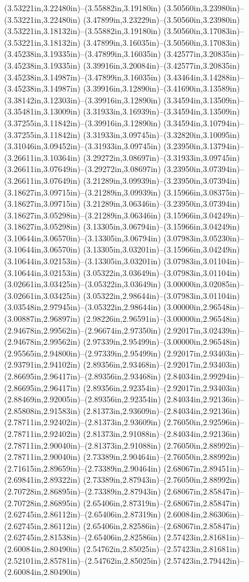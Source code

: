 (3.53221in,3.22480in)--(3.55882in,3.19180in) (3.50560in,3.23980in)--(3.53221in,3.22480in) (3.47899in,3.23229in)--(3.50560in,3.23980in) (3.53221in,3.18132in)--(3.55882in,3.19180in) (3.50560in,3.17083in)--(3.53221in,3.18132in) (3.47899in,3.16035in)--(3.50560in,3.17083in) (3.45238in,3.19335in)--(3.47899in,3.16035in) (3.42577in,3.20835in)--(3.45238in,3.19335in) (3.39916in,3.20084in)--(3.42577in,3.20835in) (3.45238in,3.14987in)--(3.47899in,3.16035in) (3.43464in,3.14288in)--(3.45238in,3.14987in) (3.39916in,3.12890in)--(3.41690in,3.13589in) (3.38142in,3.12303in)--(3.39916in,3.12890in) (3.34594in,3.13509in)--(3.35481in,3.13009in) (3.31933in,3.16939in)--(3.34594in,3.13509in) (3.37255in,3.11842in)--(3.39916in,3.12890in) (3.34594in,3.10794in)--(3.37255in,3.11842in) (3.31933in,3.09745in)--(3.32820in,3.10095in) (3.31046in,3.09452in)--(3.31933in,3.09745in) (3.23950in,3.13794in)--(3.26611in,3.10364in) (3.29272in,3.08697in)--(3.31933in,3.09745in) (3.26611in,3.07649in)--(3.29272in,3.08697in) (3.23950in,3.07394in)--(3.26611in,3.07649in) (3.21289in,3.09939in)--(3.23950in,3.07394in) (3.18627in,3.09715in)--(3.21289in,3.09939in) (3.15966in,3.08375in)--(3.18627in,3.09715in) (3.21289in,3.06346in)--(3.23950in,3.07394in) (3.18627in,3.05298in)--(3.21289in,3.06346in) (3.15966in,3.04249in)--(3.18627in,3.05298in) (3.13305in,3.06794in)--(3.15966in,3.04249in) (3.10644in,3.06570in)--(3.13305in,3.06794in) (3.07983in,3.05230in)--(3.10644in,3.06570in) (3.13305in,3.03201in)--(3.15966in,3.04249in) (3.10644in,3.02153in)--(3.13305in,3.03201in) (3.07983in,3.01104in)--(3.10644in,3.02153in) (3.05322in,3.03649in)--(3.07983in,3.01104in) (3.02661in,3.03425in)--(3.05322in,3.03649in) (3.00000in,3.02085in)--(3.02661in,3.03425in) (3.05322in,2.98644in)--(3.07983in,3.01104in) (3.03548in,2.97945in)--(3.05322in,2.98644in) (3.00000in,2.96548in)--(3.00887in,2.96897in) (2.98226in,2.96591in)--(3.00000in,2.96548in) (2.94678in,2.99562in)--(2.96674in,2.97350in) (2.92017in,3.02439in)--(2.94678in,2.99562in) (2.97339in,2.95499in)--(3.00000in,2.96548in) (2.95565in,2.94800in)--(2.97339in,2.95499in) (2.92017in,2.93403in)--(2.93791in,2.94102in) (2.89356in,2.93468in)--(2.92017in,2.93403in) (2.86695in,2.96417in)--(2.89356in,2.93468in) (2.84034in,2.99294in)--(2.86695in,2.96417in) (2.89356in,2.92354in)--(2.92017in,2.93403in) (2.88469in,2.92005in)--(2.89356in,2.92354in) (2.84034in,2.92136in)--(2.85808in,2.91583in) (2.81373in,2.93609in)--(2.84034in,2.92136in) (2.78711in,2.92402in)--(2.81373in,2.93609in) (2.76050in,2.92596in)--(2.78711in,2.92402in) (2.81373in,2.91088in)--(2.84034in,2.92136in) (2.78711in,2.90040in)--(2.81373in,2.91088in) (2.76050in,2.88992in)--(2.78711in,2.90040in) (2.73389in,2.90464in)--(2.76050in,2.88992in) (2.71615in,2.89659in)--(2.73389in,2.90464in) (2.68067in,2.89451in)--(2.69841in,2.89322in) (2.73389in,2.87943in)--(2.76050in,2.88992in) (2.70728in,2.86895in)--(2.73389in,2.87943in) (2.68067in,2.85847in)--(2.70728in,2.86895in) (2.65406in,2.87319in)--(2.68067in,2.85847in) (2.62745in,2.86112in)--(2.65406in,2.87319in) (2.60084in,2.86306in)--(2.62745in,2.86112in) (2.65406in,2.82586in)--(2.68067in,2.85847in) (2.62745in,2.81538in)--(2.65406in,2.82586in) (2.57423in,2.81681in)--(2.60084in,2.80490in) (2.54762in,2.85025in)--(2.57423in,2.81681in) (2.52101in,2.85781in)--(2.54762in,2.85025in) (2.57423in,2.79442in)--(2.60084in,2.80490in) 